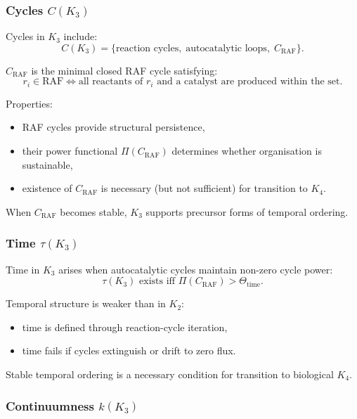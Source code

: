 \subsubsection{Cycles \texorpdfstring{$C(K_3)$}{C(K_3)}}

Cycles in $K_3$ include:
\[
C(K_3) = \{\text{reaction cycles},\;
           \text{autocatalytic loops},\;
           C_{\mathrm{RAF}}\}.
\]

$C_{\mathrm{RAF}}$ is the minimal closed RAF cycle satisfying:
\[
r_i \in \text{RAF} \iff \text{all reactants of $r_i$ and a catalyst
are produced within the set.}
\]

Properties:
\begin{itemize}
    \item RAF cycles provide structural persistence,
    \item their power functional $\Pi(C_{\mathrm{RAF}})$ determines
          whether organisation is sustainable,
    \item existence of $C_{\mathrm{RAF}}$ is necessary (but not
          sufficient) for transition to $K_4$.
\end{itemize}

When $C_{\mathrm{RAF}}$ becomes stable, $K_3$ supports precursor forms of
temporal ordering.

\subsubsection{Time \texorpdfstring{$\tau(K_3)$}{\tau(K_3)}}

Time in $K_3$ arises when autocatalytic cycles maintain non-zero cycle
power:
\[
\tau(K_3) \text{ exists iff } \Pi(C_{\mathrm{RAF}}) >
\Theta_{\mathrm{time}}.
\]

Temporal structure is weaker than in $K_2$:
\begin{itemize}
    \item time is defined through reaction-cycle iteration,
    \item time fails if cycles extinguish or drift to zero flux.
\end{itemize}

Stable temporal ordering is a necessary condition for transition to
biological $K_4$.

\subsubsection{Continuumness \texorpdfstring{$k(K_3)$}{k(K_3)}}

